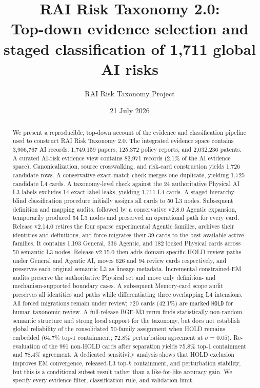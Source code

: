 \documentclass[11pt,a4paper]{article}
\title{\vspace{-1.3cm}\bfseries\Large RAI Risk Taxonomy 2.0:\\[3pt]
Top-down evidence selection and staged classification of 1,711 global AI risks}
\author{RAI Risk Taxonomy Project}
\date{21 July 2026}
\newcommand{\code}[1]{\texttt{#1}}
\begin{document}
\maketitle

\begin{abstract}
We present a reproducible, top-down account of the evidence and classification
pipeline used to construct RAI Risk Taxonomy 2.0. The integrated evidence space
contains 3,906,767 AI records: 1,749,159 papers, 125,372 policy reports, and
2,032,236 patents. A curated AI-risk evidence view contains 82,971 records
(2.1\% of the AI evidence space). Canonicalization, source crosswalking, and
risk-card construction yields 1,726 candidate rows. A conservative exact-match
check merges one duplicate, yielding 1,725 candidate L4 cards. A taxonomy-level
check against the 24 authoritative Physical AI L3 labels excludes 14 exact
label leaks, yielding 1,711 L4 cards. A staged hierarchy-blind classification
procedure initially assigns all cards to 50 L3 nodes. Subsequent definition and
mapping audits, followed by a conservative v2.8.0 Agentic expansion, temporarily
produced 54 L3 nodes and preserved an operational path for every card. Release
v2.14.0 retires the four sparse experimental Agentic families, archives their
identities and definitions, and force-migrates their 39 cards to the best
available active families. It contains 1,193 General, 336 Agentic, and 182
locked Physical cards across 50 semantic L3 nodes. Release v2.15.0 then adds
domain-specific HOLD review paths under General and Agentic AI, moves 626 and
94 review cards respectively, and preserves each original semantic L3 as
lineage metadata. Incremental
constrained-EM audits preserve the authoritative Physical set and move only
definition- and mechanism-supported boundary cases. A subsequent Memory-card
scope audit preserves all identities and paths while differentiating three
overlapping L4 intensions. All forced migrations remain under review; 720 cards
(42.1\%) are marked
\code{HOLD} for human taxonomic review. A full-release BGE-M3 rerun finds
statistically non-random semantic structure and strong local support for the
taxonomy, but does not establish global reliability of the consolidated
50-family assignment when HOLD remains embedded (64.7\% top-1 containment;
72.8\% perturbation agreement at $\sigma=0.05$). Re-evaluation of the 991
non-HOLD cards after separation yields 75.8\% top-1 containment and 78.4\%
agreement. A dedicated sensitivity analysis shows that HOLD exclusion improves
EM convergence, released-L3 top-$k$ containment, and perturbation stability,
but this is a conditional subset result rather than a like-for-like accuracy
gain. We specify every evidence filter, classification
rule, and validation limit.
\end{abstract}
\end{document}
